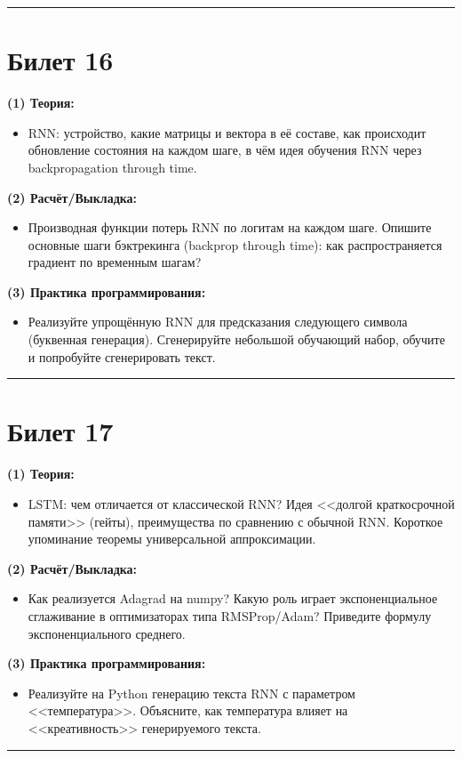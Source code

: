 \documentclass[a4paper,12pt]{article}
\begin{document}
\noindent\rule{\textwidth}{0.4pt}
\newpage

\section*{Билет 16}
\textbf{(1) Теория:}
\begin{itemize}
  \item RNN: устройство, какие матрицы и вектора в её составе, как происходит обновление состояния на каждом шаге, в чём идея обучения RNN через backpropagation through time.
\end{itemize}

\textbf{(2) Расчёт/Выкладка:}
\begin{itemize}
  \item Производная функции потерь RNN по логитам на каждом шаге. Опишите основные шаги бэктрекинга (backprop through time): как распространяется градиент по временным шагам?
\end{itemize}

\textbf{(3) Практика программирования:}
\begin{itemize}
  \item Реализуйте упрощённую RNN для предсказания следующего символа (буквенная генерация). Сгенерируйте небольшой обучающий набор, обучите и попробуйте сгенерировать текст.
\end{itemize}

\noindent\rule{\textwidth}{0.4pt}
\newpage

\section*{Билет 17}
\textbf{(1) Теория:}
\begin{itemize}
  \item LSTM: чем отличается от классической RNN? Идея <<долгой краткосрочной памяти>> (гейты), преимущества по сравнению с обычной RNN. Короткое упоминание теоремы универсальной аппроксимации.
\end{itemize}

\textbf{(2) Расчёт/Выкладка:}
\begin{itemize}
  \item Как реализуется Adagrad на numpy? Какую роль играет экспоненциальное сглаживание в оптимизаторах типа RMSProp/Adam? Приведите формулу экспоненциального среднего.
\end{itemize}

\textbf{(3) Практика программирования:}
\begin{itemize}
  \item Реализуйте на Python генерацию текста RNN с параметром <<температура>>. Объясните, как температура влияет на <<креативность>> генерируемого текста.
\end{itemize}

\noindent\rule{\textwidth}{0.4pt}
\end{document}
